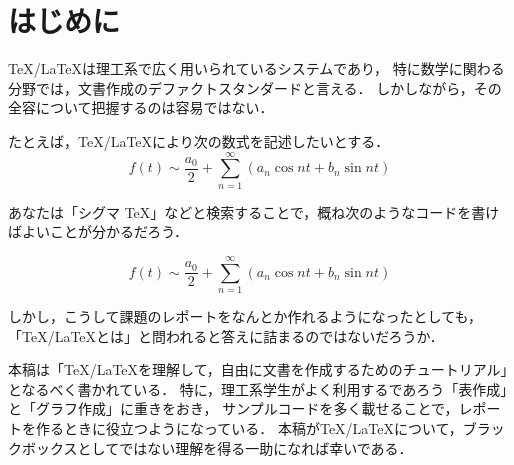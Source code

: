 \documentclass[../index]{subfiles}
\begin{document}
\chapter{はじめに}
\TeX /\LaTeX は理工系で広く用いられているシステムであり，
特に数学に関わる分野では，文書作成のデファクトスタンダードと言える．
しかしながら，その全容について把握するのは容易ではない．

たとえば，\TeX /\LaTeX により次の数式を記述したいとする．
\[
  f(t) \sim \frac{a_0}{2} + \sum_{n=1}^\infty (a_n\cos nt + b_n\sin nt)
\]

あなたは「シグマ TeX」などと検索することで，概ね次のようなコードを書けばよいことが分かるだろう．
\begin{codeblock}
\[
  f(t) \sim \frac{a_0}{2} + \sum_{n=1}^\infty (a_n\cos nt + b_n\sin nt)
\]
\end{codeblock}

しかし，こうして課題のレポートをなんとか作れるようになったとしても，
「\TeX /\LaTeX とは」と問われると答えに詰まるのではないだろうか．

本稿は「\TeX /\LaTeX を理解して，自由に文書を作成するためのチュートリアル」となるべく書かれている．
特に，理工系学生がよく利用するであろう「表作成」と「グラフ作成」に重きをおき，
サンプルコードを多く載せることで，レポートを作るときに役立つようになっている．
本稿が\TeX /\LaTeX について，ブラックボックスとしてではない理解を得る一助になれば幸いである．
\end{document}
